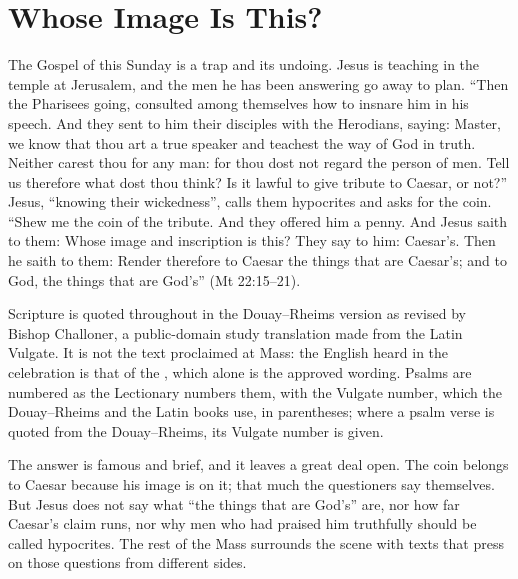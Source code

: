 \section{Whose Image Is This?}
\label{sec:opening}

The Gospel of this Sunday is a trap and its undoing. Jesus is teaching in the
temple at Jerusalem, and the men he has been answering go away to plan.
``Then the Pharisees going, consulted among themselves how to insnare him in
his speech. And they sent to him their disciples with the Herodians, saying:
Master, we know that thou art a true speaker and teachest the way of God in
truth. Neither carest thou for any man: for thou dost not regard the person of
men. Tell us therefore what dost thou think? Is it lawful to give tribute to
Caesar, or not?'' Jesus, ``knowing their wickedness'', calls them hypocrites
and asks for the coin. ``Shew me the coin of the tribute. And they offered him
a penny. And Jesus saith to them: Whose image and inscription is this? They
say to him: Caesar's. Then he saith to them: Render therefore to Caesar the
things that are Caesar's; and to God, the things that are God's'' (Mt
22:15--21).

{\small\noindent Scripture is quoted throughout in the Douay--Rheims version as
revised by Bishop Challoner, a public-domain study translation made from the
Latin Vulgate. It is not the text proclaimed at Mass: the English heard in the
celebration is that of the , which alone is the approved wording. Psalms are
numbered as the Lectionary numbers them, with the Vulgate number, which the
Douay--Rheims and the Latin books use, in parentheses; where a psalm verse is
quoted from the Douay--Rheims, its Vulgate number is given.\par}
\medskip

The answer is famous and brief, and it leaves a great deal open. The coin
belongs to Caesar because his image is on it; that much the questioners say
themselves. But Jesus does not say what ``the things that are God's'' are, nor
how far Caesar's claim runs, nor why men who had praised him truthfully should
be called hypocrites. The rest of the Mass surrounds the scene with texts that
press on those questions from different sides.

